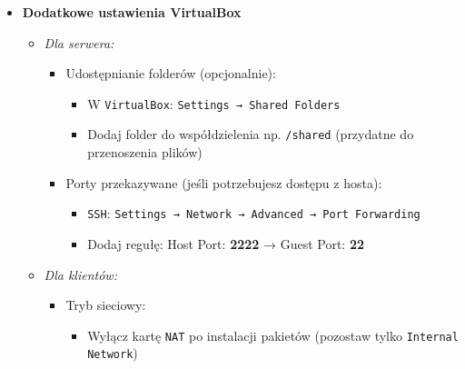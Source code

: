 \begin{itemize}
      \item \textbf{Dodatkowe ustawienia VirtualBox}
      \begin{itemize}
          \item \textit{Dla serwera:}
          \begin{itemize}
              \item Udostępnianie folderów (opcjonalnie):
              \begin{itemize}
                  \item W \texttt{VirtualBox}: \texttt{Settings → Shared Folders}
                  \item Dodaj folder do współdzielenia np. \texttt{/shared} (przydatne do przenoszenia plików)
              \end{itemize}
              \item Porty przekazywane (jeśli potrzebujesz dostępu z hosta):
              \begin{itemize}
                  \item \texttt{SSH}: \texttt{Settings → Network → Advanced → Port Forwarding}
                  \item Dodaj regułę: Host Port: \textbf{2222} → Guest Port: \textbf{22}
              \end{itemize}
          \end{itemize}
          \item \textit{Dla klientów:}
          \begin{itemize}
              \item Tryb sieciowy:
              \begin{itemize}
                  \item Wyłącz kartę \texttt{NAT} po instalacji pakietów (pozostaw tylko \texttt{Internal Network})
              \end{itemize}
          \end{itemize}
      \end{itemize}
      \end{itemize}